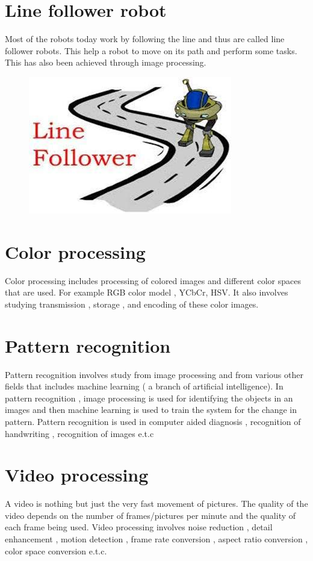 \documentclass[a4paper]{article}
\begin{document}
  \section{Line follower robot}
  Most of the robots today work by following the line and thus are called line follower robots. This help a robot to move on its path and perform some tasks. This has also been achieved through image processing.

\begin{figure}[h]
\centering
\includegraphics{op}
\end{figure}
 \section{Color processing}
 Color processing includes processing of colored images and different color spaces that are used. For example RGB color model , YCbCr, HSV. It also involves studying transmission , storage , and encoding of these color images.
  \section{Pattern recognition}
   Pattern recognition involves study from image processing and from various other fields that includes machine learning ( a branch of artificial intelligence). In pattern recognition , image processing is used for identifying the objects in an images and then machine learning is used to train the system for the change in pattern. Pattern recognition is used in computer aided diagnosis , recognition of handwriting , recognition of images e.t.c
\section{Video processing}
  A video is nothing but just the very fast movement of pictures. The quality of the video depends on the number of frames/pictures per minute and the quality of each frame being used. Video processing involves noise reduction , detail enhancement , motion detection , frame rate conversion , aspect ratio conversion , color space conversion e.t.c.
\newpage 
\end{document}

